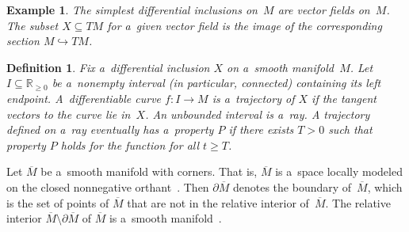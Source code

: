 \documentclass[11pt]{article}
\newtheorem{Definition}[Theorem]{Definition}
\newtheorem{Example}[Theorem]{Example}
\newcommand\ol[1]{{\overline {#1}}}
\begin{document}
\begin{Example}\label{e:vectorfield}
The simplest dif\/ferential inclusions on~$M$ are vector f\/ields on~$M$.
The subset $X\subseteq TM$ for a~given vector f\/ield is the image of the corresponding section $M\hookrightarrow TM$.
\end{Example}

\begin{Definition}\label{def:trajectory}
Fix a~dif\/ferential inclusion $X$ on a~smooth manifold~$M$.
Let $I\subseteq\mathbb{R}_{\geq 0}$ be a~nonempty interval (in particular, connected) containing its left endpoint.
A~dif\/fe\-ren\-tiab\-le curve $f:I\to M$ is a~\emph{trajectory} of $X$ if the tangent vectors to the curve lie in~$X$.
An unbounded interval is a~\emph{ray}.
A trajectory def\/ined on a~ray \emph{eventually} has a~property $P$ if there exists $T>0$ such that property $P$ holds
for the function for all $t\geq T$.
\end{Definition}

Let $\ol M$ be a~smooth manifold with corners.
That is, $\ol M$ is a~space locally modeled on the closed nonnegative orthant~\cite[p.~363]{Lee02smooth}.
Then $\partial\ol M$ denotes the boundary of~$\ol M$, which is the set of points of $\ol M$ that are not in the
relative interior of~$\ol M$.
The relative interior $\ol M\setminus\partial\ol M$ of $\ol M$
is a~smooth manifold~\cite[p.~386, Examples~14--19]{Lee02smooth}.
\end{document}
